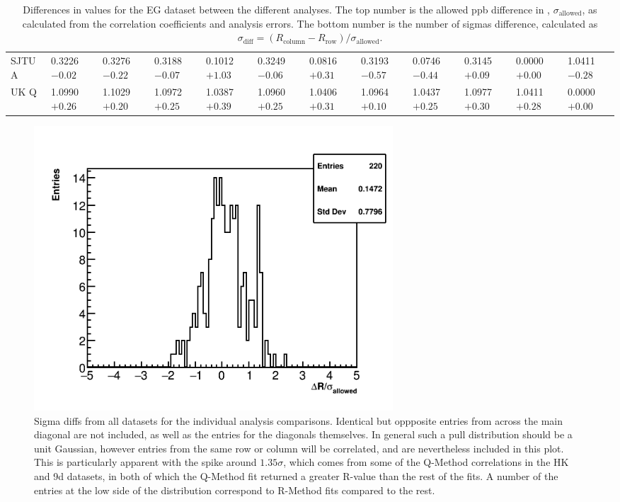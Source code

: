 \begin{landscape}
\begin{table}
\begin{tabularx}{1\linewidth}{@{\extracolsep{\fill}}lXXXXXXXXXXX}
	SJTU A & 0.3226 $-0.02$ & 0.3276 $-0.22$ & 0.3188 $-0.07$ & 0.1012 $+1.03$ & 0.3249 $-0.06$ & 0.0816 $+0.31$ & 0.3193 $-0.57$ & 0.0746 $-0.44$ & 0.3145 $+0.09$ & 0.0000 $+0.00$ & 1.0411 $-0.28$  \\
	UK Q   & 1.0990 $+0.26$ & 1.1029 $+0.20$ & 1.0972 $+0.25$ & 1.0387 $+0.39$ & 1.0960 $+0.25$ & 1.0406 $+0.31$ & 1.0964 $+0.10$ & 1.0437 $+0.25$ & 1.0977 $+0.30$ & 1.0411 $+0.28$ & 0.0000 $+0.00$  \\
  \bottomrule
\end{tabularx}
\caption[]{Differences in \R values for the EG dataset between the different analyses. The top number is the allowed ppb difference in \R, $\sigma_{\text{allowed}}$, as calculated from the correlation coefficients and analysis errors. The bottom number is the number of sigmas difference, calculated as $\sigma_{\text{diff}} = (R_{\text{column}}-R_{\text{row}})/\sigma_{\text{allowed}}$.}
\label{tab:EG_diff}
\end{table}
\end{landscape}







\begin{figure}[]
\centering
\includegraphics[width=0.65\textwidth]{AllSigmas}
\caption{Sigma diffs from all datasets for the individual analysis comparisons. Identical but oppposite entries from across the main diagonal are not included, as well as the entries for the diagonals themselves. In general such a pull distribution should be a unit Gaussian, however entries from the same row or column will be correlated, and are nevertheless included in this plot. This is particularly apparent with the spike around $1.35\sigma$, which comes from some of the Q-Method correlations in the HK and 9d datasets, in both of which the Q-Method fit returned a greater R-value than the rest of the fits. A number of the entries at the low side of the distribution correspond to R-Method fits compared to the rest.}
\label{fig:AllSigmas}
\end{figure}





